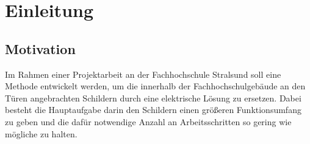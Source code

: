 


\chapter{ Einleitung }
\vspace{-3cm}
\begin{flushleft}
% 
% 

\section{Motivation}
\label{sec:Motivation}
Im Rahmen einer Projektarbeit an der Fachhochschule Stralsund soll eine Methode entwickelt werden, um die innerhalb der Fachhochschulgebäude 
an den Türen angebrachten Schildern durch eine elektrische Lösung zu ersetzen. Dabei besteht die Hauptaufgabe darin den Schildern einen größeren Funktionsumfang zu geben und die dafür notwendige Anzahl an Arbeitsschritten so gering wie mögliche zu halten.  


\end{flushleft}
